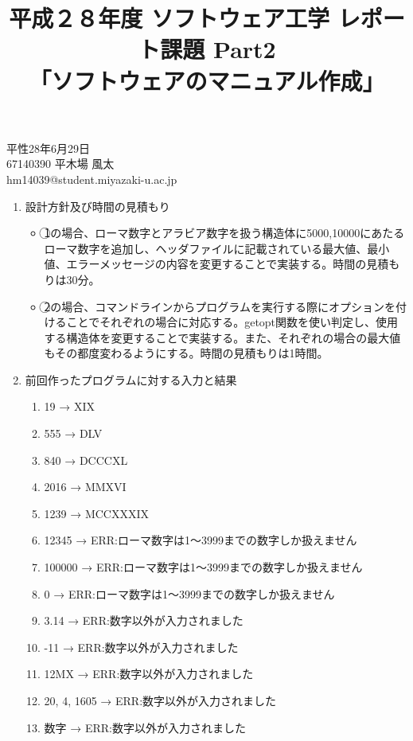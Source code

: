 \documentclass[10.5pt]{jsarticle}
\begin{document}
\title{平成２８年度 ソフトウェア工学 レポート課題 Part2\\「ソフトウェアのマニュアル作成」}
\date{}
\maketitle

\begin{flushright}
{\large 平性28年6月29日}\\
{\large 67140390 平木場 風太}\\
{\large hm14039@student.miyazaki-u.ac.jp}\\
\end{flushright}

\vspace{0.5in}

\begin{large}
\begin{enumerate}
\item 設計方針及び時間の見積もり

\begin{itemize}
  \item \textcircled{\scriptsize 1}の場合、ローマ数字とアラビア数字を扱う構造体に5000,10000にあたるローマ数字を追加し、ヘッダファイルに記載されている最大値、最小値、エラーメッセージの内容を変更することで実装する。時間の見積もりは30分。

  \item \textcircled{\scriptsize 2}の場合、コマンドラインからプログラムを実行する際にオプションを付けることでそれぞれの場合に対応する。getopt関数を使い判定し、使用する構造体を変更することで実装する。また、それぞれの場合の最大値もその都度変わるようにする。時間の見積もりは1時間。\\
\end{itemize}

\item 前回作ったプログラムに対する入力と結果

\begin{enumerate}[入力(1)]
  \item 19 → XIX
  \item 555 → DLV
  \item 840 → DCCCXL
  \item 2016 → MMXVI
  \item 1239 → MCCXXXIX
  \item 12345 → ERR:ローマ数字は1〜3999までの数字しか扱えません
  \item 100000 → ERR:ローマ数字は1〜3999までの数字しか扱えません
  \item 0 → ERR:ローマ数字は1〜3999までの数字しか扱えません
  \item 3.14 → ERR:数字以外が入力されました
  \item -11 → ERR:数字以外が入力されました
  \item 12MX → ERR:数字以外が入力されました
  \item 20, 4, 1605 → ERR:数字以外が入力されました
  \item 数字 → ERR:数字以外が入力されました
\end{enumerate}


\end{enumerate}
\end{large}
\end{document}
